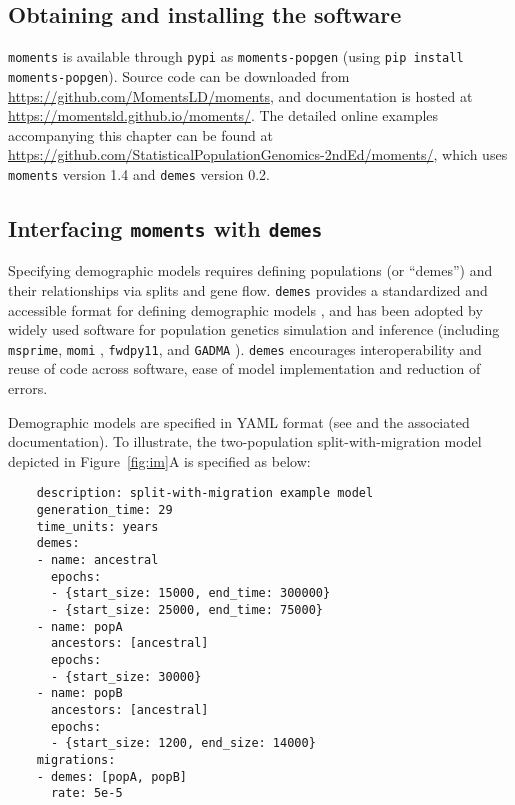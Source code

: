 \documentclass[]{article}
\newcommand{\moments}{\texttt{moments}\xspace}
\newcommand{\demes}{\texttt{demes}\xspace}
\newcommand{\msprime}{\texttt{msprime}\xspace}
\newcommand{\momi}{\texttt{momi}\xspace}
\newcommand{\fwdpy}{\texttt{fwdpy11}\xspace}
\begin{document}
\subsection*{Obtaining and installing the software}

\moments is available through \texttt{pypi} as \texttt{moments-popgen} (using
\texttt{pip install moments-popgen}). Source code can be downloaded from
\url{https://github.com/MomentsLD/moments}, and  documentation is hosted at
\url{https://momentsld.github.io/moments/}. The detailed online examples
accompanying this chapter can be found at
\url{https://github.com/StatisticalPopulationGenomics-2ndEd/moments/}, which uses
\moments version 1.4 and \demes version 0.2.

\subsection*{Interfacing \moments with \demes}

Specifying demographic models requires defining populations (or ``demes'') and
their relationships via splits and gene flow. \demes provides a standardized
and accessible format for defining demographic models \cite{gower2022demes},
and has been adopted by widely used software for population genetics simulation
and inference (including \msprime \cite{baumdicker2022efficient}, \momi
\cite{dilber2024faster}, \fwdpy \cite{thornton2019polygenic}, and
\texttt{GADMA} \cite{noskova2023gadma2}). \demes encourages interoperability
and reuse of code across software, ease of model implementation and reduction
of errors.

Demographic models are specified in YAML format (see \cite{gower2022demes} and
the associated documentation). To illustrate, the two-population
split-with-migration model depicted in Figure~\ref{fig:im}A is specified as
below:

\singlespacing
\begin{verbatim}
    description: split-with-migration example model
    generation_time: 29
    time_units: years
    demes:
    - name: ancestral
      epochs:
      - {start_size: 15000, end_time: 300000}
      - {start_size: 25000, end_time: 75000}
    - name: popA
      ancestors: [ancestral]
      epochs:
      - {start_size: 30000}
    - name: popB
      ancestors: [ancestral]
      epochs:
      - {start_size: 1200, end_size: 14000}
    migrations:
    - demes: [popA, popB]
      rate: 5e-5
\end{verbatim}
\doublespacing
\end{document}
